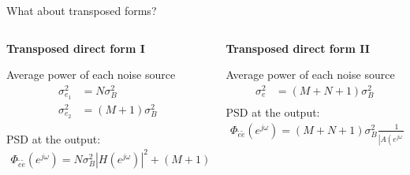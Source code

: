 \documentclass[10pt, handout]{beamer}
\begin{document}
\begin{frame}{What about transposed forms?}
	\begin{columns}[t]
		\begin{column}{0.5\textwidth}
			\textbf{Transposed direct form I}
			\begin{center}
				\resizebox{1.2\textwidth}{!}{}
			\end{center}
			Average power of each noise source
			\onslide<3|handout:0> {
			\begin{align*}
				\sigma_{e_1}^2 &= N\sigma_B^2 \\
				\sigma_{e_2}^2 &= (M+1)\sigma_B^2
			\end{align*}
			}
			
			PSD at the output:
			\onslide<3|handout:0> {
			\begin{align*}
				\Phi_{\tilde{e}\tilde{e}}(e^{j\omega}) = N\sigma_B^2|H(e^{j\omega})|^2 + (M+1)\sigma_B^2
			\end{align*}
			}
		
		\end{column}
		\begin{column}{0.5\textwidth}
			\textbf{Transposed direct form II}
			\vspace{-0.07cm}
			\begin{center}
				\resizebox{\textwidth}{!}{}
			\end{center}
			Average power of each noise source
			\onslide<3|handout:0> {
				\begin{align*}
				\sigma_{e}^2 &= (M+N+1)\sigma_B^2 \\
				\end{align*}
				\vspace{-0.2cm}
			}
			PSD at the output:
			\onslide<3|handout:0> {
				\begin{align*}
				\Phi_{\tilde{e}\tilde{e}}(e^{j\omega}) = (M+N+1)\sigma_B^2\frac{1}{|A(e^{j\omega})|^2}
				\end{align*}
			}
		\end{column}
	\end{columns}
\end{frame}
\end{document}
